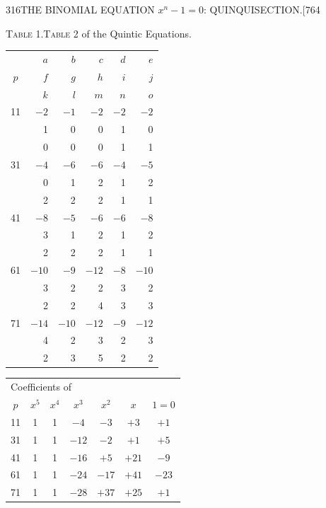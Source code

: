 \documentclass[11pt]{article}
\begin{document}
\begin{center}
{\small 316\hfill THE BINOMIAL EQUATION $x^n - 1 = 0$: QUINQUISECTION.\hfill [764}
\end{center}

\begin{center}
\textsc{Table 1.}\hspace{2cm}\textsc{Table 2} of the Quintic Equations.
\end{center}

\begin{center}
\begin{tabular}{c|rrrrr}
& $a$ & $b$ & $c$ & $d$ & $e$ \\
$p$ & $f$ & $g$ & $h$ & $i$ & $j$ \\
& $k$ & $l$ & $m$ & $n$ & $o$ \\
\hline
11 & $-2$ & $-1$ & $-2$ & $-2$ & $-2$ \\
& 1 & 0 & 0 & 1 & 0 \\
& 0 & 0 & 0 & 1 & 1 \\
\hline
31 & $-4$ & $-6$ & $-6$ & $-4$ & $-5$ \\
& 0 & 1 & 2 & 1 & 2 \\
& 2 & 2 & 2 & 1 & 1 \\
\hline
41 & $-8$ & $-5$ & $-6$ & $-6$ & $-8$ \\
& 3 & 1 & 2 & 1 & 2 \\
& 2 & 2 & 2 & 1 & 1 \\
\hline
61 & $-10$ & $-9$ & $-12$ & $-8$ & $-10$ \\
& 3 & 2 & 2 & 3 & 2 \\
& 2 & 2 & 4 & 3 & 3 \\
\hline
71 & $-14$ & $-10$ & $-12$ & $-9$ & $-12$ \\
& 4 & 2 & 3 & 2 & 3 \\
& 2 & 3 & 5 & 2 & 2 \\
\end{tabular}
\qquad
\begin{tabular}{c|cccccc}
\multicolumn{7}{l}{Coefficients of} \\
$p$ & $x^5$ & $x^4$ & $x^3$ & $x^2$ & $x$ & $1 = 0$ \\
\hline
11 & 1 & 1 & $-4$ & $-3$ & $+3$ & $+1$ \\
31 & 1 & 1 & $-12$ & $-2$ & $+1$ & $+5$ \\
41 & 1 & 1 & $-16$ & $+5$ & $+21$ & $-9$ \\
61 & 1 & 1 & $-24$ & $-17$ & $+41$ & $-23$ \\
71 & 1 & 1 & $-28$ & $+37$ & $+25$ & $+1$ \\
\end{tabular}
\end{center}
\end{document}
